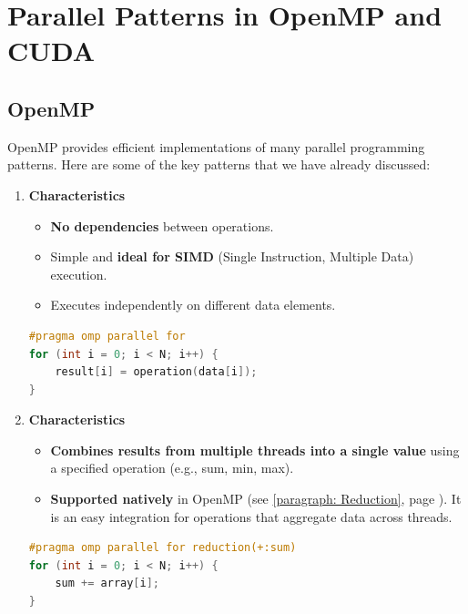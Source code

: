 \section{Parallel Patterns in OpenMP and CUDA}

\subsection{OpenMP}

OpenMP provides efficient implementations of many parallel programming patterns. Here are some of the key patterns that we have already discussed:
\begin{enumerate}
    \item {}
    \begin{flushleft}
        \textcolor{Green3}{ \textbf{Characteristics}}
    \end{flushleft}
    \begin{itemize}
        \item \textbf{No dependencies} between operations.
        \item Simple and \textbf{ideal for SIMD} (Single Instruction, Multiple Data) execution.
        \item Executes independently on different data elements.
    \end{itemize}
    \begin{examplebox}
        \begin{lstlisting}[language=c++]
#pragma omp parallel for
for (int i = 0; i < N; i++) {
    result[i] = operation(data[i]);
}\end{lstlisting}
    \end{examplebox}
    
    \item {}
    \begin{flushleft}
        \textcolor{Green3}{ \textbf{Characteristics}}
    \end{flushleft}
    \begin{itemize}
        \item \textbf{Combines results from multiple threads into a single value} using a specified operation (e.g., sum, min, max).
        \item \textbf{Supported natively} in OpenMP (see \ref{paragraph: Reduction}, page \pageref{paragraph: Reduction}). It is an easy integration for operations that aggregate data across threads.
    \end{itemize}
    \begin{examplebox}
        \begin{lstlisting}[language=c++]
#pragma omp parallel for reduction(+:sum)
for (int i = 0; i < N; i++) {
    sum += array[i];
}\end{lstlisting}
    \end{examplebox}
    

\end{enumerate}
